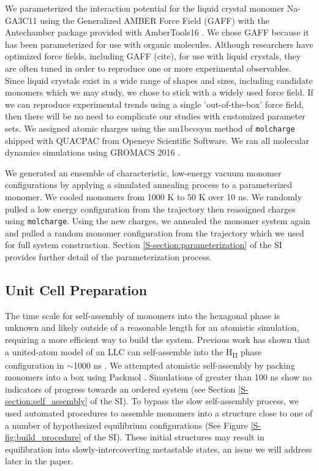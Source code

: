 \documentclass[journal=jpcbfk,manuscript=article]{achemso}
\begin{document}
  We parameterized the interaction potential for the liquid crystal monomer
  Na-GA3C11 using the Generalized AMBER Force Field (GAFF)
  \cite{wang_development_2004} with the Antechamber package
  \cite{wang_automatic_2006} provided with AmberTools16
  \cite{case_ambertools16_2016}. We chose GAFF because it has been parameterized
  for use with organic molecules. Although researchers have optimized force
  fields, including GAFF (cite), for use with liquid crystals, they are often
  tuned in order to reproduce one or more experimental observables. Since liquid
  crystals exist in a wide range of shapes and sizes, including candidate
  monomers which we may study, we chose to stick with a widely used force field.
  If we can reproduce experimental trends using a single 'out-of-the-box' force
  field, then there will be no need to complicate our studies with customized
  parameter sets. We assigned atomic charges using the am1bccsym method of
  \texttt{molcharge} shipped with QUACPAC from Openeye Scientific Software. We
  ran all molecular dynamics simulations using GROMACS 2016
  \cite{bekker_gromacs:_1993,berendsen_gromacs:_1995,van_der_spoel_gromacs:_2005,hess_gromacs_2008}.

  We generated an ensemble of characteristic, low-energy vacuum monomer
  configurations by applying a simulated annealing process to a
  parameterized monomer. We cooled monomers from 1000 K to 50 K over 10
  ns. We randomly pulled a low energy configuration from the
  trajectory then reassigned charges using \texttt{molcharge}. Using the new
  charges, we annealed the monomer system again and pulled a random monomer
  configuration from the trajectory which we used for full system
  construction. Section \ref{S-section:parameterization} 
  of the SI provides further detail of the parameterization process.

  \subsection{Unit Cell Preparation}\label{method:unitcell_build}

  The time scale for self-assembly of monomers into the hexagonal phase is
  unknown and likely outside of a reasonable length for an atomistic simulation,
  requiring a more efficient way to build the system. Previous work has shown
  that a united-atom model of an LLC can self-assemble into the
  H\textsubscript{II} phase configuration in $\sim$1000 ns
  \cite{mondal_self-assembly_2013}. We attempted atomistic self-assembly by
  packing monomers into a box using Packmol \cite{martinez_packmol:_2009}.
  Simulations of greater than 100 ns show no indicators of progress towards an
  ordered system (see Section \ref{S-section:self_assembly} of the SI). To bypass
  the slow self-assembly process, we used automated procedures to
  assemble monomers into a structure close to one of a number of hypothesized
  equilibrium configurations (See Figure \ref{S-fig:build_procedure} of the SI).
  These initial structures may result in equilibration into slowly-intercoverting
  metastable states, an issue we will address later in the paper. 
\end{document}
